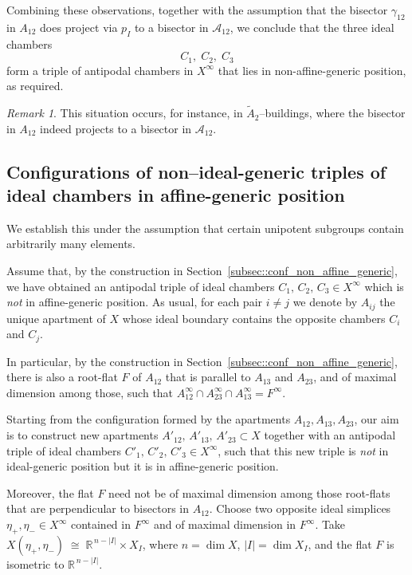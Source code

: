 \documentclass[11pt]{amsart}
\theoremstyle{plain}
\theoremstyle{definition}
\theoremstyle{remark}
\newtheorem{rem}[thm]{Remark}
\begin{document}
	Combining these observations, together with the assumption that  the bisector $\gamma_{12}$ in $A_{12}$ does project via $p_{I}$ to a bisector in $\mathcal{A}_{12}$, we conclude that the three ideal chambers
	\[
	C_{1},\; C_{2},\; C_{3}
	\]
	form a triple of antipodal chambers in $X^{\infty}$ that lies in non-affine-generic position, as required.  
	\begin{rem}
		This situation occurs, for instance, in $\widetilde{A}_{2}$--buildings, where the bisector in $A_{12}$ indeed projects to a bisector in $\mathcal{A}_{12}$. 
	\end{rem}
	
	
	\subsection{Configurations of non--ideal-generic triples of ideal chambers in affine-generic position}
	\label{subsec::conf_non_ideal_generic} We establish this under the assumption that certain unipotent subgroups contain arbitrarily many elements.

	
	Assume that, by the construction in Section~\ref{subsec::conf_non_affine_generic}, we have obtained an antipodal triple of ideal chambers \(C_1,\, C_2,\, C_3 \in X^{\infty}\) which is \emph{not} in affine-generic position.  As usual, for each pair \(i \neq j\) we denote by \(A_{ij}\) the unique apartment of \(X\) whose ideal boundary contains the opposite chambers \(C_i\) and \(C_j\).
	
	 In particular, by the construction in Section~\ref{subsec::conf_non_affine_generic},  there is also a root-flat $F$ of $A_{12}$ that is parallel to $A_{13}$ and $A_{23}$, and of maximal dimension among those, such that $A_{12}^\infty \cap A_{23}^\infty \cap A_{13}^\infty = F^{\infty}$. 
	
	Starting from the configuration formed by the apartments 
	\(A_{12}, A_{13}, A_{23}\), our aim is to construct new apartments \(
	A'_{12},\, A'_{13},\, A'_{23} \subset X\) together with an antipodal triple of ideal chambers \(C'_1,\, C'_2,\, C'_3 \in X^{\infty}\), such that this new triple is \emph{not} in ideal-generic position but it is in affine-generic position.
	
	Moreover, the flat \(F\) need not be of maximal dimension among those root-flats that are perpendicular to bisectors in $A_{12}$. Choose two opposite ideal simplices \(\eta_{+}, \eta_{-} \in X^{\infty}\) 
	contained in \(F^{\infty}\) and of maximal dimension in \(F^{\infty}\). Take \(X(\eta_{+}, \eta_{-}) \;\cong\; \mathbb{R}^{\,n - |I|} \times X_I\), where \(n = \dim X\), \(|I| = \dim X_I\), and the flat \(F\) is isometric to \(\mathbb{R}^{\,n - |I|}\).
	
\end{document}
